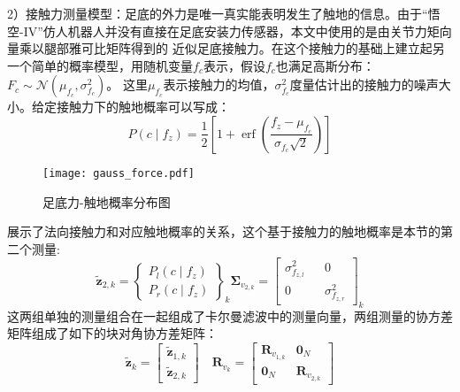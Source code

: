 2）接触力测量模型：足底的外力是唯一真实能表明发生了触地的信息。由于“悟空-IV”仿人机器人并没有直接在足底安装力传感器，本文中使用的是由关节力矩向量乘以腿部雅可比矩阵得到的
近似足底接触力。在这个接触力的基础上建立起另一个简单的概率模型，用随机变量$f_c$表示，假设$f_c$也满足高斯分布：$F_c \sim \mathcal{N}\left(\mu_{f_c}, \sigma_{f_c}^2\right)$。
这里$\mu_{f_c}$表示接触力的均值，$\sigma_{f_c}^2$度量估计出的接触力的噪声大小。给定接触力下的触地概率可以写成：
\begin{equation}
    \label{equ:est_force_prob}
    P\left(c \mid f_z\right)=\frac{1}{2}\left[1+\operatorname{erf}\left(\frac{f_z-\mu_{f_c}}{\sigma_{f_c} \sqrt{2}}\right)\right]
\end{equation}
\begin{figure}[htbp]
    \centering
    \texttt{[image: gauss\_force.pdf]}
    \caption{\label{fig:gauss_force}足底力-触地概率分布图}
\end{figure}
展示了法向接触力和对应触地概率的关系，这个基于接触力的触地概率是本节的第二个测量:
\begin{equation}
    \label{equ:est_force_noise}
    \tilde{\boldsymbol{z}}_{2, k}=\left\{\begin{array}{c}
        P_l\left(c \mid f_z\right) \\
        P_r\left(c \mid f_z\right)
        \end{array}\right\}_k \boldsymbol{\Sigma}_{v_{2, k}}=\left[\begin{array}{ccc}
        \sigma_{f_{z, l}}^2 & & 0 \\
        0 & & \sigma_{f_{z, r}}^2
        \end{array}\right]_k
\end{equation}
这两组单独的测量组合在一起组成了卡尔曼滤波中的测量向量，两组测量的协方差矩阵组成了如下的块对角协方差矩阵：
\begin{equation}
    \label{equ:est_h_and_f}
    \tilde{\boldsymbol{z}}_k=\left[\begin{array}{c}
        \tilde{\boldsymbol{z}}_{1, k} \\
        \tilde{\boldsymbol{z}}_{2, k}
        \end{array}\right] \quad \boldsymbol{R}_{v_k}=\left[\begin{array}{cc}
        \boldsymbol{R}_{v_{1, k}} & \mathbf{0}_N \\
        \mathbf{0}_N & \boldsymbol{R}_{v_{2, k}}
        \end{array}\right]
\end{equation}
